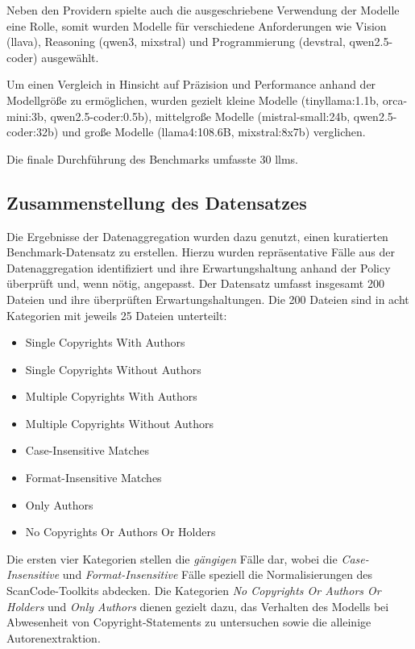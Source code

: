 Neben den Providern spielte auch die ausgeschriebene Verwendung der Modelle eine Rolle, somit wurden Modelle für verschiedene Anforderungen wie Vision (llava), Reasoning (qwen3, mixstral) und Programmierung (devstral, qwen2.5-coder) ausgewählt.

Um einen Vergleich in Hinsicht auf Präzision und Performance anhand der Modellgröße zu ermöglichen, wurden gezielt kleine Modelle (tinyllama:1.1b, orca-mini:3b, qwen2.5-coder:0.5b), mittelgroße Modelle (mistral-small:24b, qwen2.5-coder:32b) und große Modelle (llama4:108.6B, mixstral:8x7b) verglichen.

Die finale Durchführung des Benchmarks umfasste 30 \glspl{llm}.


\subsection{Zusammenstellung des Datensatzes}\label{sec:datensatz-benchmark}

Die Ergebnisse der Datenaggregation wurden dazu genutzt, einen kuratierten Benchmark-Datensatz zu erstellen.
Hierzu wurden repräsentative Fälle aus der Datenaggregation identifiziert und ihre Erwartungshaltung anhand der Policy überprüft und, wenn nötig, angepasst.
Der Datensatz umfasst insgesamt \num{200} Dateien und ihre überprüften Erwartungshaltungen.
Die \num{200} Dateien sind in acht Kategorien mit jeweils \num{25} Dateien unterteilt:

\begin{itemize}
    \item Single Copyrights With Authors
    \item Single Copyrights Without Authors
    \item Multiple Copyrights With Authors
    \item Multiple Copyrights Without Authors
    \item Case-Insensitive Matches
    \item Format-Insensitive Matches
    \item Only Authors
    \item No Copyrights Or Authors Or Holders
\end{itemize}

Die ersten vier Kategorien stellen die \textit{gängigen} Fälle dar, wobei die \textit{Case-Insensitive} und \textit{Format-Insensitive} Fälle speziell die Normalisierungen des ScanCode-Toolkits abdecken.
Die Kategorien \textit{No Copyrights Or Authors Or Holders} und \textit{Only Authors} dienen gezielt dazu, das Verhalten des Modells bei Abwesenheit von Copyright-Statements zu untersuchen sowie die alleinige Autorenextraktion.

